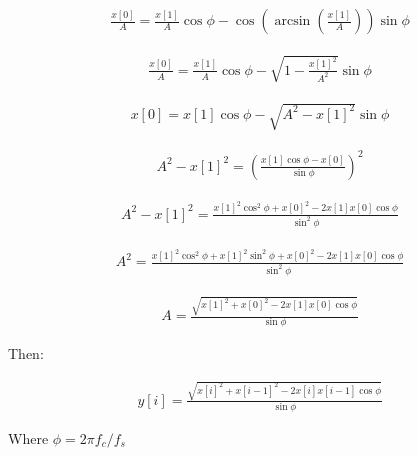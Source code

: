 \documentclass[fleqn]{article}
\begin{document}
\begin{align*}
\frac{x[0]}{A}=\frac{x[1]}{A}\cos\phi-\cos\left(\arcsin\left(\frac{x[1]}{A}\right)\right)\sin\phi
\end{align*}

\begin{align*}
\frac{x[0]}{A}=\frac{x[1]}{A}\cos\phi-\sqrt{1-\frac{x[1]^{2}}{A^{2}}}\sin\phi
\end{align*}

\begin{align*}
x[0]=x[1]\cos\phi-\sqrt{A^{2}-x[1]^{2}}\sin\phi
\end{align*}

\begin{align*}
A^{2}-x[1]^{2}=\left(\frac{x[1]\cos\phi-x[0]}{\sin\phi}\right)^{2}
\end{align*}

\begin{align*}
A^{2}-x[1]^{2}=\frac{x[1]^{2}\cos^{2}\phi+x[0]^{2}-2x[1]x[0]\cos\phi}{\sin^{2}\phi}
\end{align*}

\begin{align*}
A^{2}=\frac{x[1]^{2}\cos^{2}\phi+x[1]^{2}\sin^{2}\phi+x[0]^{2}-2x[1]x[0]\cos\phi}{\sin^{2}\phi}
\end{align*}

\begin{align*}
A=\frac{\sqrt{x[1]^{2}+x[0]^{2}-2x[1]x[0]\cos\phi}}{\sin\phi}
\end{align*}

Then:

\begin{align*}
y[i]=\frac{\sqrt{x[i]^{2}+x[i-1]^{2}-2x[i]x[i-1]\cos\phi}}{\sin\phi}
\end{align*}

Where $\phi = 2\pi f_c / f_s$ 
\end{document}
